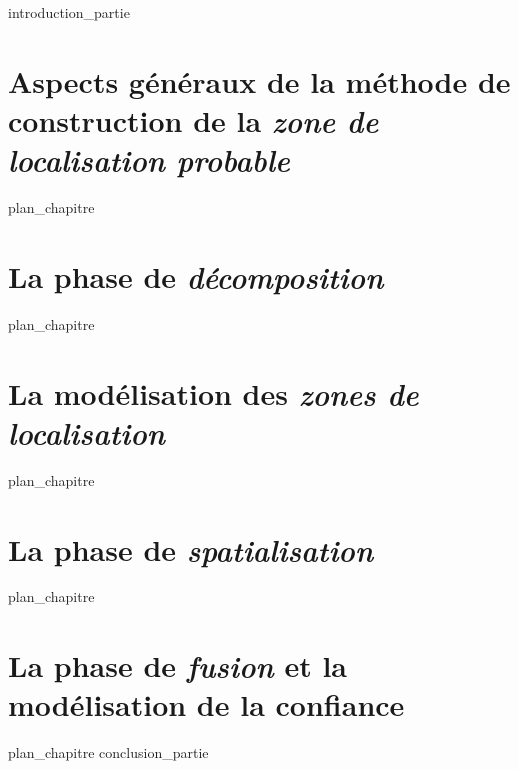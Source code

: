 \label{part:02_int}
{introduction_partie}
%
\chapter{Aspects généraux de la méthode de construction de la
  \emph{zone de localisation probable}}
\label{chap:04}
{plan_chapitre}
%
\chapter{La phase de \emph{décomposition}}
\label{chap:05}
{plan_chapitre}
%
\chapter{La modélisation des \emph{zones de localisation}}
\label{chap:06}
{plan_chapitre}
%
\chapter{La phase de \emph{spatialisation}}
\label{chap:07}
{plan_chapitre}
%
\chapter{La phase de \emph{fusion} et la modélisation de la confiance}
\label{chap:08}
{plan_chapitre}
%
\label{part:02_cnc}
{conclusion_partie}
